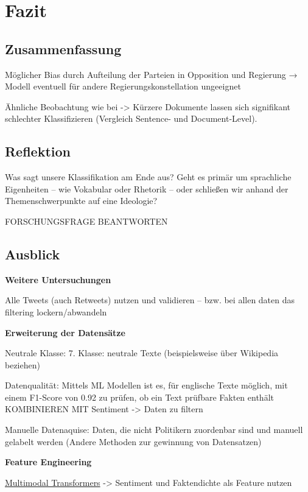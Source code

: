 
\chapter{Fazit} \label{ch:conclusion}

\section{Zusammenfassung}

Möglicher Bias durch Aufteilung der Parteien in Opposition und Regierung → Modell eventuell für andere Regierungskonstellation ungeeignet

Ähnliche Beobachtung wie bei \textcite{biessmann_predicting_2016} -> Kürzere Dokumente lassen sich signifikant schlechter Klassifizieren (Vergleich Sentence- und Document-Level).

\section{Reflektion}

Was sagt unsere Klassifikation am Ende aus? Geht es primär um sprachliche Eigenheiten -- wie Vokabular oder Rhetorik -- oder schließen wir anhand der Themenschwerpunkte auf eine Ideologie?

FORSCHUNGSFRAGE BEANTWORTEN

\section{Ausblick}

\textbf{Weitere Untersuchungen}

Alle Tweets (auch Retweets) nutzen und validieren -- bzw. bei allen daten das filtering lockern/abwandeln

\textbf{Erweiterung der Datensätze}

Neutrale Klasse: 7. Klasse: neutrale Texte (beispielsweise über Wikipedia beziehen)

Datenqualität: Mittels \ac{ML} Modellen ist es, für englische Texte möglich, mit einem F1-Score von \num{0.92} zu prüfen, ob ein Text prüfbare Fakten enthält \autocite{jha_towards_2023} KOMBINIEREN MIT Sentiment -> Daten zu filtern

Manuelle Datenaquise: Daten, die nicht Politikern zuordenbar sind und manuell gelabelt werden (Andere Methoden zur gewinnung von Datensatzen)

\textbf{Feature Engineering}

\href{https://github.com/jianzhnie/MultimodalTransformers}{Multimodal Transformers} -> Sentiment und Faktendichte als Feature nutzen

